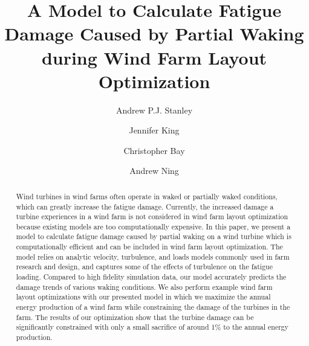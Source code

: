 \documentclass[11pt,letterpaper]{article}
\begin{document}
\title{A Model to Calculate Fatigue Damage Caused by Partial Waking during Wind Farm Layout Optimization}

\date{}

\author[1]{Andrew P.J. Stanley}
\author[2]{Jennifer King}
\author[2]{Christopher Bay}
\author[1]{Andrew Ning}




\maketitle

\begin{abstract}
Wind turbines in wind farms often operate in waked or partially waked conditions, which can greatly increase the fatigue damage. Currently, the increased damage a turbine experiences in a wind farm is not considered in wind farm layout optimization because existing models are too computationally expensive. In this paper, we present a model to calculate fatigue damage caused by partial waking on a wind turbine which is computationally efficient and can be included in wind farm layout optimization. The model relies on analytic velocity, turbulence, and loads models commonly used in farm research and design, and captures some of the effects of turbulence on the fatigue loading. Compared to high fidelity simulation data, our model accurately predicts the damage trends of various waking conditions. We also perform example wind farm layout optimizations with our presented model in which we maximize the annual energy production of a wind farm while constraining the damage of the turbines in the farm. The results of our optimization show that the turbine damage can be significantly constrained with only a small sacrifice of around 1\% to the annual energy production.
\end{abstract}
\end{document}
